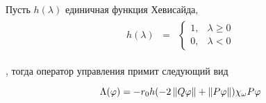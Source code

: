 \begin{remark}
    Пусть $h(\lambda)$ единичная функция Хевисайда, \\
    \begin{gather*}
        \begin{matrix}
            h(\lambda) & =
            & \left\{
            \begin{matrix}
                1, & \lambda \ge 0 \\
                0, & \lambda < 0
            \end{matrix} \right.
        \end{matrix}
    \end{gather*}

    , тогда оператор управления примит следующий вид

    \begin{equation}
        \Lambda(\varphi) = -r_0 h(-2\left\lVert Q\varphi\right\rVert +
        \left\lVert P\varphi\right\rVert)\chi_{\omega}P\varphi
    \end{equation}

\end{remark}


